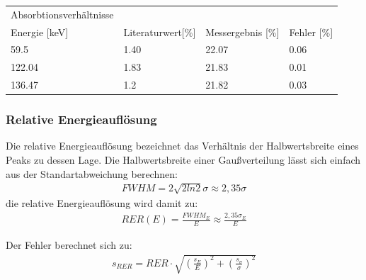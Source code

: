 \documentclass[12pt]{article}
\begin{document}
\begin{center}
\begin{tabular}{|l|lll|}
\hline
Absorbtionsverhältnisse \\
Energie [keV] & Literaturwert[\%] & Messergebnis [\%] & Fehler [\%] \\
\hline
59.5 & 1.40 & 22.07 & 0.06 \\
122.04 & 1.83 & 21.83 & 0.01 \\
136.47 & 1.2 & 21.82 & 0.03 \\
\hline
\end{tabular}
\end{center}



\subsubsection{Relative Energieauflösung}
Die relative Energieauflösung bezeichnet das Verhältnis der Halbwertsbreite
eines Peaks zu dessen Lage. Die Halbwertsbreite einer Gaußverteilung lässt sich einfach aus der Standartabweichung berechnen:
\begin{align*}
 FWHM = 2\sqrt{2 ln 2} \sigma \approx 2,35\sigma
\end{align*}
die relative Energieauflösung wird damit zu:
\begin{align*}
 RER(E) = \frac{FWHM_E}{E} \approx \frac{2,35\sigma_E}{E}
\end{align*}

Der Fehler berechnet sich zu:
\begin{align*}
 s_{RER} = RER \cdot \sqrt{\left(\frac{s_E}{E}\right)^2 + \left(\frac{s_{\sigma}}{\sigma}\right)^2}
\end{align*}
\end{document}
